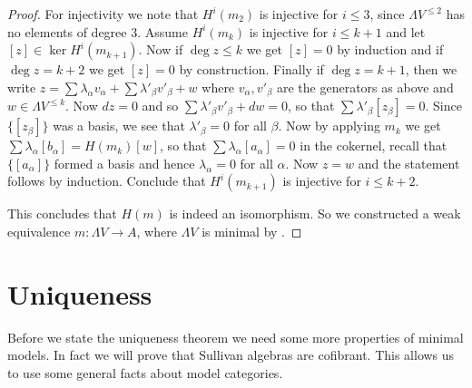 \begin{proof}
	For injectivity we note that $H^i(m_2)$ is injective for $i \leq 3$, since $\Lambda V^{\leq 2}$ has no elements of degree $3$. Assume $H^i(m_k)$ is injective for $i \leq k+1$ and let $[z] \in \ker H^i(m_{k+1})$. Now if $\deg{z} \leq k$ we get $[z] = 0$ by induction and if $\deg{z} = k+2$ we get $[z] = 0$ by construction. Finally if $\deg{z} = k+1$, then we write $z = \sum \lambda_\alpha v_\alpha + \sum \lambda'_\beta v'_\beta + w$ where $v_\alpha, v'_\beta$ are the generators as above and $w \in \Lambda V^{\leq k}$. Now $d z = 0$ and so $\sum \lambda'_\beta v'_\beta + dw = 0$, so that $\sum \lambda'_\beta [z_\beta] = 0$. Since $\{ [z_\beta] \}$ was a basis, we see that $\lambda'_\beta = 0$ for all $\beta$. Now by applying $m_k$ we get $\sum \lambda_\alpha [b_\alpha] = H(m_k)[w]$, so that $\sum \lambda_\alpha [a_\alpha] = 0$ in the cokernel, recall that $\{ [a_\alpha] \}$ formed a basis and hence $\lambda_\alpha = 0$ for all $\alpha$. Now $z = w$ and the statement follows by induction. Conclude that $H^i(m_{k+1})$ is injective for $i \leq k+2$.

	This concludes that $H(m)$ is indeed an isomorphism. So we constructed a weak equivalence $m: \Lambda V \to A$, where $\Lambda V$ is minimal by .
\end{proof}


\section{Uniqueness}

Before we state the uniqueness theorem we need some more properties of minimal models. In fact we will prove that Sullivan algebras are cofibrant. This allows us to use some general facts about model categories.

